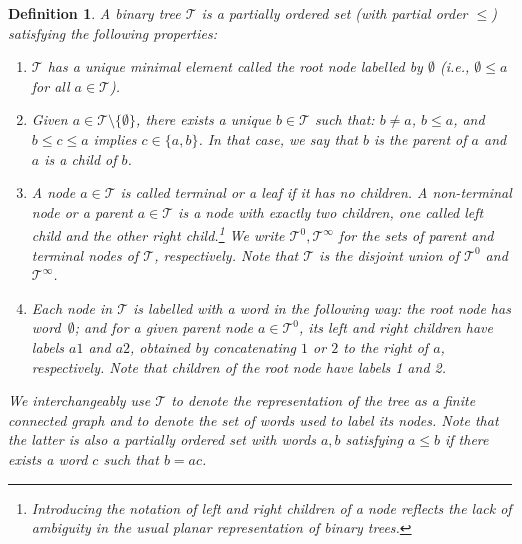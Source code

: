 \documentclass[%
11pt,  reqno]{amsart}
\newcommand{\5}{\textup{V}}
\newcommand{\noi}{\noindent}
\newtheorem{definition}[theorem]{Definition}
\theoremstyle{remark}
\newcommand{\TT}{\mathcal{T}}
\numberwithin{equation}{section}
\numberwithin{theorem}{section}
\begin{document}
\begin{definition}%
\label{DEF:tree}
\rm 
A \emph{binary tree} $\TT$ is a partially ordered set (with partial order $\le$) satisfying the following properties:

\begin{enumerate}
\item[(i)] $\TT$ has a unique minimal element called the \textit{root node} labelled by $\emptyset$ (i.e., $\emptyset \le a$ for all $a \in \TT$). 

\smallskip 
\item[(ii)] Given $a\in \TT\setminus \{ \emptyset \}$, 
there exists a unique $b \in \TT$ such that: $b\ne a$, $b \le a$, and $b \le c \le a$ implies $c\in\{a,b\}$. In that case, we say that $b$ is the \textit{parent} of $a$ and $a$ is a \textit{child} of $b$. 

\smallskip 
\item[(iii)] A node $a\in \TT$ is called \textit{terminal} or a \textit{leaf} if it has no children. A \textit{non-terminal node} or a \textit{parent} $a\in\TT$ is a node with exactly two children, one called \textit{left child} and the other \textit{right child}.\footnote{Introducing the notation of left and right children of a node  reflects the lack of ambiguity in the usual planar representation of binary trees.} %
We write $\TT^0, \TT^\infty$ for the sets of parent and terminal nodes of $\TT$, respectively.  Note that $\TT$ is the disjoint union of $\TT^0$ and $\TT^\infty$. 

\smallskip 
\item[(iv)]
Each node in $\TT$ is labelled with a word in the following way: the root node has word~$\emptyset$; and for a given parent node $a\in \TT^0$, its left and right children have labels $a1$ and $a2$,  obtained by concatenating $1$ or $2$ to the right of $a$, respectively. Note that children of the root node have labels 1 and 2. 


\end{enumerate}



\noi
We interchangeably use $\TT$ to denote the representation of the tree as a finite connected graph and to denote the set of words used to label its nodes. Note that the latter is also a partially ordered set with words $a,b$ satisfying $a\le b$ if there exists a word $c$ such that $b = ac$. 



\end{definition}
\end{document}
